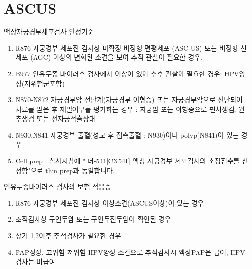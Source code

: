 \section{ASCUS}
%
{액상자궁경부세포검사 인정기준
\begin{enumerate}\tightlist
\item R876 자궁경부 세포진 검사상 미확정 비정형 편평세포 (ASC-US) 또는 비정형 선세포 (AGC) 이상의 변화된 소견을 보여 추적 관찰이 필요한 경우.
\item B977 인유두종 바이러스 검사에서 이상이 있어 추후 관찰이 필요한 경우: HPV양성(저위험군포함)
\item N870-N872 자궁경부암 전단계(자궁경부 이형증) 또는 자궁경부암으로 진단되어 치료를 받은 후 재발여부를 평가하는 경우
: 자궁암 또는 이형증으로 펀치생검, 원추생검 또는 전자궁적출상태
\item N930,N841 자궁경부 출혈(성교 후 접촉출혈 : N930)이나 polyp(N841)이 있는 경우 
\item Cell prep : 심사지침에 " 너-541[CX541] 액상 자궁경부 세포검사의 소정점수를 산정함"으로 thin prep과 동일합니다.
\end{enumerate}

인유두종바이러스 검사의 보험 적응증
\begin{enumerate}\tightlist 
\item R876 자궁경부 세포진 검사상 이상소견(ASCUS이상)이 있는 경우
\item 조직검사상 구인두암 또는 구인두전두암이 확인된 경우
\item 상기 1,2이후 추적검사가 필요한 경우
\item PAP정상, 고위험 저위험 HPV양성 소견으로 추적검사시 액상PAP은 급여, HPV검사는 비급여
\end{enumerate}}

